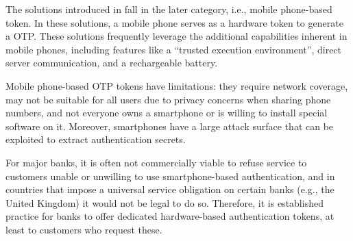 






The solutions introduced in \cite{SARA22,KoganMB17,KonothFFARB20}
fall in the later category, i.e., mobile phone-based token. In these solutions, a mobile phone serves as a hardware token to generate a OTP. These solutions frequently leverage the additional capabilities inherent in mobile phones, including features like a ``trusted execution environment'', direct server communication, and a rechargeable battery. 

Mobile phone-based OTP tokens have limitations: they require network coverage, may not be suitable for all users due to privacy concerns when sharing phone numbers, and not everyone owns a smartphone or is willing to install special software on it. Moreover, smartphones have a large attack surface that can be exploited to extract authentication secrets. 

For major banks, it is often not commercially viable to refuse service to customers unable or unwilling to use smartphone-based authentication, and in countries that impose a universal service obligation on certain banks (e.g., the United Kingdom) it would not be legal to do so.
Therefore, it is established practice for banks to offer dedicated hardware-based authentication tokens, at least to customers who request these.

%




%







